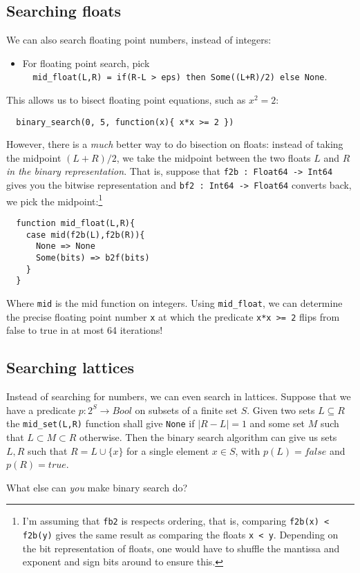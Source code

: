 \documentclass[a4paper, 11pt]{article}
\begin{document}
\subsection{Searching floats}

\noindent We can also search floating point numbers, instead of integers:
\begin{itemize}
  \item For floating point search, pick \\ \lstinline|  mid_float(L,R) = if(R-L > eps) then Some((L+R)/2) else None|.
\end{itemize}

\noindent This allows us to bisect floating point equations, such as $x^2 = 2$:

\begin{lstlisting}
  binary_search(0, 5, function(x){ x*x >= 2 })
\end{lstlisting}

\noindent However, there is a \emph{much} better way to do bisection on floats: instead of taking the midpoint $(L+R)/2$, we take the midpoint between the two floats $L$ and $R$ \emph{in the binary representation}. That is, suppose that \lstinline|f2b : Float64 -> Int64| gives you the bitwise representation and \lstinline|bf2 : Int64 -> Float64| converts back, we pick the midpoint:\footnote{I'm assuming that \lstinline|fb2| is respects ordering, that is, comparing \lstinline|f2b(x) < f2b(y)| gives the same result as comparing the floats \lstinline|x < y|. Depending on the bit representation of floats, one would have to shuffle the mantissa and exponent and sign bits around to ensure this.}

\begin{lstlisting}
  function mid_float(L,R){
    case mid(f2b(L),f2b(R)){
      None => None
      Some(bits) => b2f(bits)
    }
  }
\end{lstlisting}

\noindent Where \lstinline|mid| is the mid function on integers. Using \lstinline|mid_float|, we can determine the precise floating point number \lstinline|x| at which the predicate \lstinline|x*x >= 2| flips from false to true in at most 64 iterations!

\subsection{Searching lattices}

Instead of searching for numbers, we can even search in lattices. Suppose that we have a predicate $p : 2^S \to Bool$ on subsets of a finite set $S$. Given two sets $L \subseteq R$ the \lstinline|mid_set(L,R)| function shall give \lstinline|None| if $|R - L| = 1$ and some set $M$ such that $L \subset M \subset R$ otherwise. Then the binary search algorithm can give us sets $L,R$ such that $R = L \cup \{x\}$ for a single element $x\in S$, with $p(L) = false$ and $p(R) = true$.

\bigskip

What else can \emph{you} make binary search do?
\end{document}
